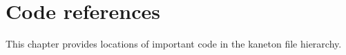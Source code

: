 %
%
%
%
%
%

%
%

\chapter{Code references}

This chapter provides locations of important code in the kaneton file
hierarchy.

